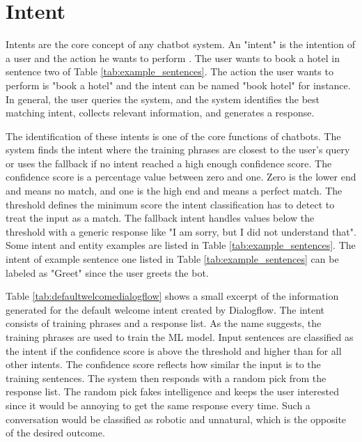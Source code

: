 \section{Intent} \label{sec:intent}
Intents are the core concept of any chatbot system.
An "intent" is the intention of a user and the action he wants to perform \cite{dutta2017developing, rahman2017programming}.
The user wants to book a hotel in sentence two of Table \ref{tab:example_sentences}.
The action the user wants to perform is "book a hotel" and the intent can be named "book hotel" for instance.
In general, the user queries the system, and the system identifies the best matching intent, collects relevant information, and generates a response.

The identification of these intents is one of the core functions of chatbots.
The system finds the intent where the training phrases are closest to the user's query or uses the fallback if no intent reached a high enough confidence score.
The confidence score is a percentage value between zero and one.
Zero is the lower end and means no match, and one is the high end and means a perfect match.
The threshold defines the minimum score the intent classification has to detect to treat the input as a match.
The fallback intent handles values below the threshold with a generic response like "I am sorry, but I did not understand that".
Some intent and entity examples are listed in Table \ref{tab:example_sentences}.
The intent of example sentence one listed in Table \ref{tab:example_sentences} can be labeled as "Greet" since the user greets the bot.

Table \ref{tab:defaultwelcomedialogflow} shows a small excerpt of the information generated for the default welcome intent created by Dialogflow.
The intent consists of training phrases and a response list.
As the name suggests, the training phrases are used to train the ML model.
Input sentences are classified as the intent if the confidence score is above the threshold and higher than for all other intents.
The confidence score reflects how similar the input is to the training sentences.
The system then responds with a random pick from the response list.
The random pick fakes intelligence and keeps the user interested since it would be annoying to get the same response every time.
Such a conversation would be classified as robotic and unnatural, which is the opposite of the desired outcome.

